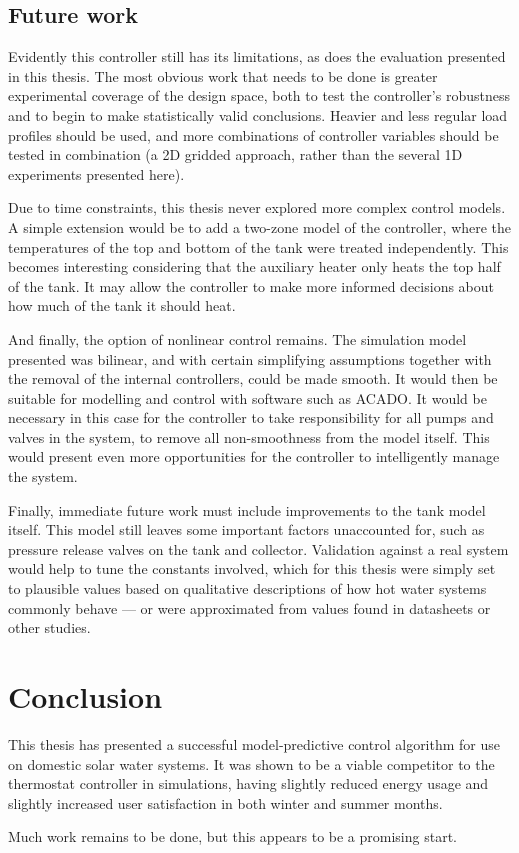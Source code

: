 \subsection{Future work}

Evidently this controller still has its limitations, as does the evaluation presented in this thesis.
The most obvious work that needs to be done is greater experimental coverage of the design space, both to test the controller's robustness and to begin to make statistically valid conclusions.
Heavier and less regular load profiles should be used, and more combinations of controller variables should be tested in combination (a 2D gridded approach, rather than the several 1D experiments presented here).

Due to time constraints, this thesis never explored more complex control models.
A simple extension would be to add a two-zone model of the controller, where the temperatures of the top and bottom of the tank were treated independently.
This becomes interesting considering that the auxiliary heater only heats the top half of the tank.
It may allow the controller to make more informed decisions about how much of the tank it should heat.

And finally, the option of nonlinear control remains.
The simulation model presented was bilinear, and with certain simplifying assumptions together with the removal of the internal controllers, could be made smooth.
It would then be suitable for modelling and control with software such as ACADO.
It would be necessary in this case for the controller to take responsibility for all pumps and valves in the system, to remove all non-smoothness from the model itself.
This would present even more opportunities for the controller to intelligently manage the system.

Finally, immediate future work must include improvements to the tank model itself.
This model still leaves some important factors unaccounted for, such as pressure release valves on the tank and collector.
Validation against a real system would help to tune the constants involved, which for this thesis were simply set to plausible values based on qualitative descriptions of how hot water systems commonly behave --- or were approximated from values found in datasheets or other studies.

\section{Conclusion}

This thesis has presented a successful model-predictive control algorithm for use on domestic solar water systems.
It was shown to be a viable competitor to the thermostat controller in simulations, having slightly reduced energy usage and slightly increased user satisfaction in both winter and summer months.

Much work remains to be done, but this appears to be a promising start.
